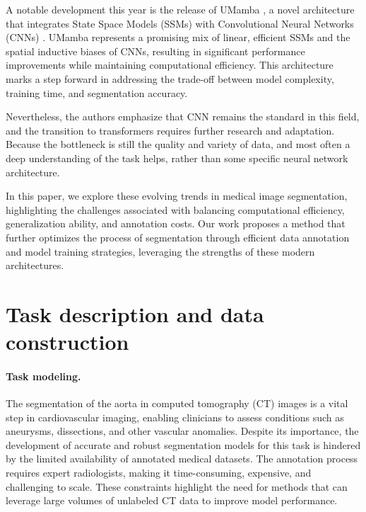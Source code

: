 \documentclass{article}
\begin{document}
A notable development this year is the release of UMamba \cite{U-Mamba}, a novel architecture that integrates State Space Models (SSMs) \cite{gu2021efficiently} with Convolutional Neural Networks (CNNs) \cite{o2015introduction}. UMamba represents a promising mix of linear, efficient SSMs and the spatial inductive biases of CNNs, resulting in significant performance improvements while maintaining computational efficiency. This architecture marks a step forward in addressing the trade-off between model complexity, training time, and segmentation accuracy.

Nevertheless, the authors \cite{li2023medshapenet} emphasize that CNN remains the standard in this field, and the transition to transformers requires further research and adaptation. Because the bottleneck is still the quality and variety of data, and most often a deep understanding of the task helps, rather than some specific neural network architecture.


In this paper, we explore these evolving trends in medical image segmentation, highlighting the challenges associated with balancing computational efficiency, generalization ability, and annotation costs. Our work proposes a method that further optimizes the process of segmentation through efficient data annotation and model training strategies, leveraging the strengths of these modern architectures.


\section{Task description and data construction}

\paragraph{Task modeling.}
The segmentation of the aorta in computed tomography (CT) images is a vital step in cardiovascular imaging, enabling clinicians to assess conditions such as aneurysms, dissections, and other vascular anomalies. Despite its importance, the development of accurate and robust segmentation models for this task is hindered by the limited availability of annotated medical datasets. The annotation process requires expert radiologists, making it time-consuming, expensive, and challenging to scale. These constraints highlight the need for methods that can leverage large volumes of unlabeled CT data to improve model performance.
\end{document}
